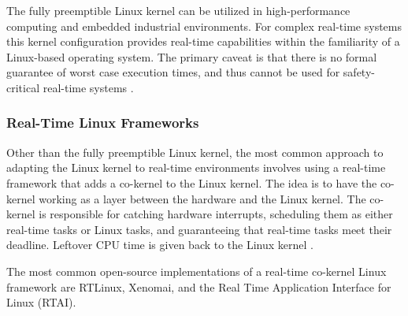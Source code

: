                 The fully preemptible Linux kernel can be utilized in
                    high-performance computing and embedded industrial
                    environments.
                For complex real-time systems this kernel configuration provides
                    real-time capabilities within the familiarity of a
                    Linux-based operating system.
                The primary caveat is that there is no formal guarantee of worst
                    case execution times, and thus cannot be used for
                    safety-critical real-time systems \cite{preempt-rt-survey}.

            \subsubsection{Real-Time Linux Frameworks}
            \markboth{}{}
                Other than the fully preemptible Linux kernel, the most common
                    approach to adapting the Linux kernel to real-time
                    environments involves using a real-time framework that adds
                    a co-kernel to the Linux kernel.
                The idea is to have the co-kernel working as a layer between the
                    hardware and the Linux kernel.
                The co-kernel is responsible for catching hardware interrupts,
                    scheduling them as either real-time tasks or Linux tasks,
                    and guaranteeing that real-time tasks meet their deadline.
                Leftover CPU time is given back to the Linux kernel
                    \cite{preempt-rt-survey}.

                The most common open-source implementations of a real-time
                    co-kernel Linux framework are RTLinux, Xenomai, and the Real
                    Time Application Interface for Linux (RTAI).

